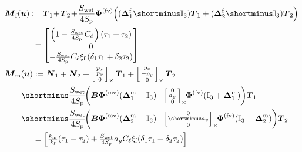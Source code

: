 \begin{align}
\label{eq:Mf}
    &\boldsymbol{M}_{\text{f}}(\boldsymbol{u}) :=  \boldsymbol{T}_{1} \!+\! \boldsymbol{T}_{2} \!+\! \frac{S_{\text{wet}}}{4S_{\text{p}}} \boldsymbol{\Phi}^{\text{(fv)}} \Big( (\boldsymbol{\Delta}^{\text{f}}_1 \shortminus \mathbb{I}_{3} ) \boldsymbol{T}_{1} + ( \boldsymbol{\Delta}^{\text{f}}_2 \shortminus \mathbb{I}_{3}) \boldsymbol{T}_{2}\Big) \nonumber\\
& \hspace*{1.2cm} =\begin{bmatrix} \left(1-\frac{S_{\text{wet}}}{4S_{\text{p}}} C_{\text{d}}\right) (\tau_{1} + \tau_{2}) \\  0  \\ -\frac{S_{\text{wet}}}{4S_{\text{p}}}C_{\ell}\xi_{\text{f}} \left(\delta_{1}\tau_{1} + \delta_{2}\tau_{2}\right) \end{bmatrix}  \\
\nonumber
 & \boldsymbol{M}_{\text{m}}(\boldsymbol{u}) := \boldsymbol{N}_{1} + \boldsymbol{N}_{2} + \skewsym{\smallm{p_x\\ p_y\\ 0}} \boldsymbol{T}_{1} + \skewsym{\smallm{p_x\\ -p_y\\ 0}} \boldsymbol{T}_{2}\\
 \nonumber
   &\qquad \shortminus \frac{S_{\text{wet}}}{4S_{\text{p}}}\! \bigg( \boldsymbol{B} \boldsymbol{\Phi}^{\text{(mv)}} (\boldsymbol{\Delta}^{\text{m}}_1- \mathbb{I}_{3} ) \! + \! \skewsym{\smallm{0 \\ a_y \\ 0}} \!\! \boldsymbol{\Phi}^{\text{(fv)}} (\mathbb{I}_{3} + \boldsymbol{\Delta}^{\text{m}}_1 ) \bigg) \boldsymbol{T}_{1} \\
   \nonumber
   &\qquad \shortminus \frac{S_{\text{wet}}}{4S_{\text{p}}} \!\bigg( \boldsymbol{B} \boldsymbol{\Phi}^{\text{(mv)}} (\boldsymbol{\Delta}^{\text{m}}_2 - \mathbb{I}_{3} ) \! + \! \skewsym{\smallm{0 \\ \!\shortminus a_y \!\\ 0}} \!\! \boldsymbol{\Phi}^{\text{(fv)}} (\mathbb{I}_{3} + \boldsymbol{\Delta}^{\text{m}}_2 ) \bigg) \boldsymbol{T}_{2} \\
   \label{eq:Mm}
   & \hspace*{1.2cm} =\begin{bmatrix} \frac{k_{\text{m}} }{k_{\text{f}}}(\tau_{1} - \tau_{2}) + \frac{S_{\text{wet}}}{4S_{\text{p}}}a_{y}C_{\ell}\xi_{\text{f}}(\delta_{1}\tau_{1} - \delta_{2}\tau_{2}) \\

\end{bmatrix}
\end{align}
